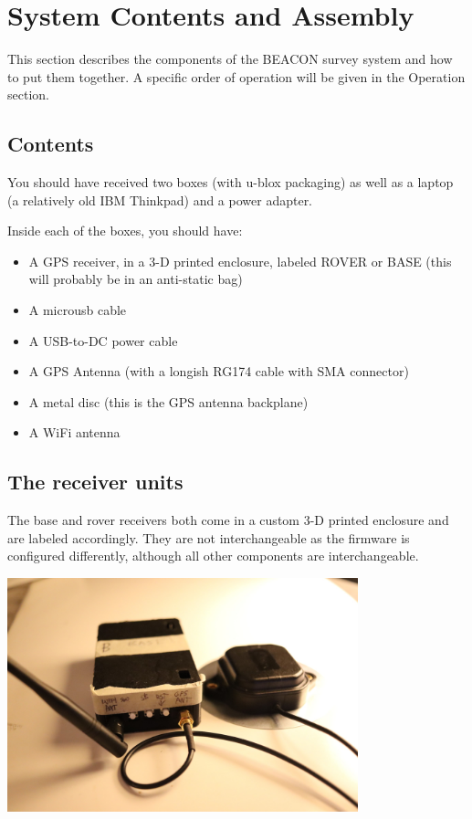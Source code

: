 \documentclass[usletter]{article}
\begin{document}
\section{System Contents and Assembly}  

This section describes the components of the BEACON survey system and how to put them together. A specific order of operation will be given in the Operation section. 

\subsection{Contents} 

You should have received two boxes (with u-blox packaging) as well as a laptop  (a relatively old IBM Thinkpad) and a power adapter. 

Inside each of the boxes, you should have: 

\begin{itemize} 
\item A GPS receiver, in a 3-D printed enclosure, labeled ROVER or BASE (this will probably be in an anti-static bag) 
\item A microusb cable
\item A USB-to-DC power cable 
\item A GPS Antenna (with a longish RG174 cable with SMA connector) 
\item A metal disc (this is the GPS antenna backplane) 
\item A WiFi antenna 
\end{itemize} 


\subsection{The receiver units} 

The base and rover receivers both come in a custom 3-D printed enclosure and
are labeled accordingly. They are not interchangeable as the firmware is
configured differently, although all other components are interchangeable.  

\begin{center} 
\includegraphics[width=4in]{receiver-front} 
\end{center} 
\end{document}
